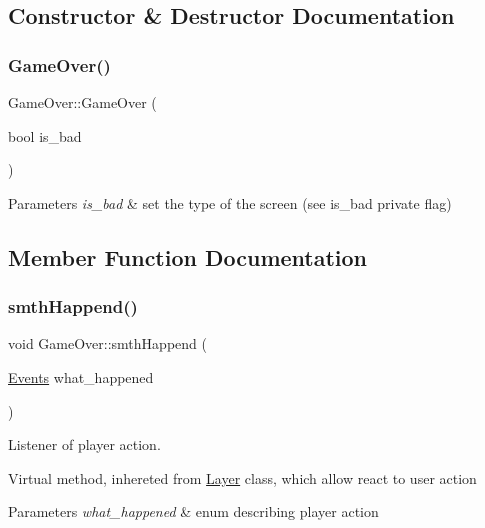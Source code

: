 \subsection{Constructor \& Destructor Documentation}
\mbox{\label{class_game_over_a3eb13fd94a63ff6dace1e1265b0c535d}} 
\subsubsection{\texorpdfstring{Game\+Over()}{GameOver()}}
{\footnotesize\ttfamily Game\+Over\+::\+Game\+Over (\begin{DoxyParamCaption}\item[{bool}]{is\+\_\+bad }\end{DoxyParamCaption})}


\begin{DoxyParams}{Parameters}
{\em is\+\_\+bad} & set the type of the screen (see is\+\_\+bad private flag) \\
\hline
\end{DoxyParams}


\subsection{Member Function Documentation}
\mbox{\label{class_game_over_a919e7ac37c476bf288f732f9a8106016}} 
\subsubsection{\texorpdfstring{smth\+Happend()}{smthHappend()}}
{\footnotesize\ttfamily void Game\+Over\+::smth\+Happend (\begin{DoxyParamCaption}\item[{\hyperlink{_events_8h_af60e00b78607064c5be6aa9397ea49c1}{Events}}]{what\+\_\+happened }\end{DoxyParamCaption})\hspace{0.3cm}{\ttfamily [virtual]}}



Listener of player action. 

Virtual method, inhereted from \hyperlink{class_layer}{Layer} class, which allow react to user action 
\begin{DoxyParams}{Parameters}
{\em what\+\_\+happened} & enum describing player action \\
\hline
\end{DoxyParams}


